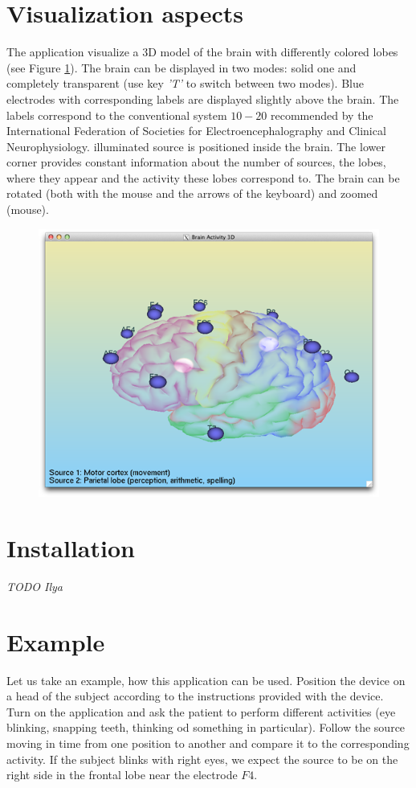 \documentclass[]{article}   %
\begin{document}
\section{Visualization aspects}
The application visualize a 3D model of the brain with differently colored lobes (see Figure \ref{fig:screenshot}). The brain can be displayed in two modes: solid one and completely transparent (use key \emph{'T'} to switch between two modes). Blue electrodes with corresponding labels are displayed slightly above the brain. The labels correspond to the conventional system $10-20$ recommended by the International Federation of Societies for Electroencephalography and Clinical Neurophysiology. illuminated source is positioned inside the brain. The lower corner provides constant information about the number of sources, the lobes, where they appear and the activity these lobes correspond to. The brain can be rotated (both with the mouse and the arrows of the keyboard) and zoomed (mouse). 
\begin{figure}[!h]
\begin{center}
\includegraphics[width=1\columnwidth]{../Images/screenshot}
\caption{}
\label{fig:screenshot} 
\end{center}
\end{figure}

\section{Installation}
\emph{TODO Ilya}

\section{Example}
Let us take an example, how this application can be used. Position the device on a head of the subject according to the instructions provided with the device. Turn on the application and ask the patient to perform different activities (eye blinking, snapping teeth, thinking od something in particular). Follow the source moving in time from one position to another and compare it to the corresponding activity. If the subject blinks with right eyes, we expect the source to be on the right side in the frontal lobe near the electrode $F4$.  



 
\end{document}
